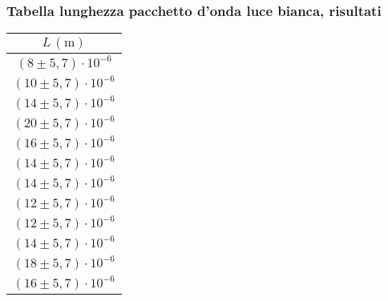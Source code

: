 \subsubsection{Tabella lunghezza pacchetto d'onda luce bianca, risultati}
    \begin{table}[H]
    \centering
        \begin{tabular}{|c|}
        \hline
        $ L \, (\text{m}) $ \\
        \hline
        $(8 \pm 5,7) \cdot 10^{-6}$ \\
        \hline
        $(10 \pm 5,7) \cdot 10^{-6}$ \\
        \hline
        $(14 \pm 5,7) \cdot 10^{-6}$ \\
        \hline
        $(20 \pm 5,7) \cdot 10^{-6}$ \\
        \hline
        $(16 \pm 5,7) \cdot 10^{-6}$ \\
        \hline
        $(14 \pm 5,7) \cdot 10^{-6}$ \\
        \hline
        $(14 \pm 5,7) \cdot 10^{-6}$ \\
        \hline
        $(12 \pm 5,7) \cdot 10^{-6}$ \\
        \hline
        $(12 \pm 5,7) \cdot 10^{-6}$ \\
        \hline
        $(14 \pm 5,7) \cdot 10^{-6}$ \\
        \hline
        $(18 \pm 5,7) \cdot 10^{-6}$ \\
        \hline
        $(16 \pm 5,7) \cdot 10^{-6}$ \\
        \hline
        \end{tabular}
    \end{table}
